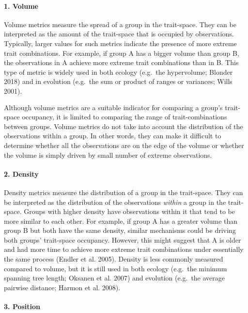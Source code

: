 \documentclass[]{article}
\let\oldparagraph\paragraph
\renewcommand{\paragraph}[1]{\oldparagraph{#1}\mbox{}}
\begin{document}
\paragraph{1. Volume}\label{volume}

Volume metrics measure the spread of a group in the trait-space. They
can be interpreted as the amount of the trait-space that is occupied by
observations. Typically, larger values for such metrics indicate the
presence of more extreme trait combinations. For example, if group A has
a bigger volume than group B, the observations in A achieve more extreme
trait combinations than in B. This type of metric is widely used in both
ecology (e.g.~the hypervolume; Blonder 2018) and in evolution (e.g.~the
sum or product of ranges or variances; Wills 2001).

Although volume metrics are a suitable indicator for comparing a group's
trait-space occupancy, it is limited to comparing the range of
trait-combinations between groups. Volume metrics do not take into
account the distribution of the observations within a group. In other
words, they can make it difficult to determine whether all the
observations are on the edge of the volume or whether the volume is
simply driven by small number of extreme observations.

\paragraph{2. Density}\label{density}

Density metrics measure the distribution of a group in the trait-space.
They can be interpreted as the distribution of the observations
\emph{within} a group in the trait-space. Groups with higher density
have observations within it that tend to be more similar to each other.
For example, if group A has a greater volume than group B but both have
the same density, similar mechanisms could be driving both groups'
trait-space occupancy. However, this might suggest that A is older and
had more time to achieve more extreme trait combinations under
essentially the same process (Endler et al. 2005). Density is less
commonly measured compared to volume, but it is still used in both
ecology (e.g.~the minimum spanning tree length; Oksanen et al. 2007) and
evolution (e.g.~the average pairwise distance; Harmon et al. 2008).

\paragraph{3. Position}\label{position}
\end{document}
